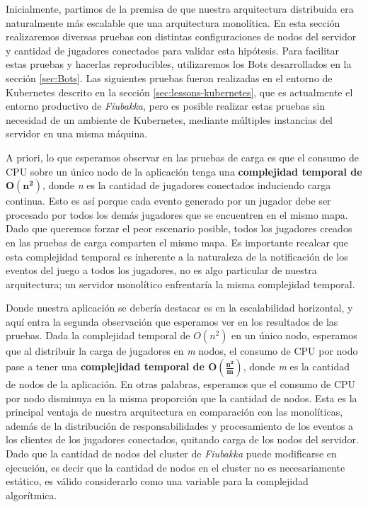 
\noindent Inicialmente, partimos de la premisa de que nuestra arquitectura distribuida era naturalmente más escalable
que una arquitectura monolítica. En esta sección realizaremos diversas pruebas con distintas configuraciones de nodos del servidor y cantidad
de jugadores conectados para validar esta hipótesis. Para facilitar estas pruebas y hacerlas reproducibles, utilizaremos los Bots desarrollados
en la sección \ref{sec:Bots}. Las siguientes pruebas fueron realizadas en el entorno de Kubernetes descrito en la sección \ref{sec:lessons-kubernetes}, que es actualmente el entorno
productivo de \textit{Fiubakka}, pero es posible realizar estas pruebas sin necesidad de un ambiente de Kubernetes, mediante múltiples instancias del
servidor en una misma máquina.

A priori, lo que esperamos observar en las pruebas de carga es que el consumo de CPU sobre un único nodo de la aplicación tenga una \textbf{complejidad temporal
de $\boldsymbol{O(n^2)}$}, donde \textit{n} es la cantidad de jugadores conectados induciendo carga continua. Esto es así porque cada evento generado por un jugador debe ser procesado por todos los
demás jugadores que se encuentren en el mismo mapa. Dado que queremos forzar el peor escenario posible, todos los jugadores creados en las pruebas de carga comparten el mismo mapa.
Es importante recalcar que esta complejidad temporal es inherente a la naturaleza de la notificación de los eventos del juego a todos los jugadores, no es algo particular de nuestra arquitectura; un servidor monolítico
enfrentaría la misma complejidad temporal.

Donde nuestra aplicación se debería destacar es en la escalabilidad horizontal, y aquí entra la segunda observación que esperamos ver en los resultados de las pruebas. Dada la complejidad temporal de
$O(n^2)$ en un único nodo, esperamos que al distribuir la carga de jugadores en \textit{m} nodos, el consumo de CPU por nodo pase a tener una \textbf{complejidad temporal de $\boldsymbol{O(\frac{n^2}{m})}$}, donde \textit{m} es la cantidad de nodos
de la aplicación. En otras palabras, esperamos que el consumo de CPU por nodo disminuya en la misma proporción que la cantidad de nodos. Esta es la principal ventaja de nuestra arquitectura en comparación con las monolíticas,
además de la distribución de responsabilidades y procesamiento de los eventos a los clientes de los jugadores conectados, quitando carga de los nodos del servidor.
Dado que la cantidad de nodos del cluster de \textit{Fiubakka} puede modificarse en ejecución, es decir que la cantidad de nodos en el cluster no es necesariamente estático, es válido considerarlo como una variable para la complejidad
algorítmica.

